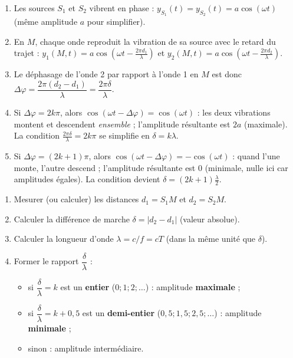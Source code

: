 \documentclass[11pt]{article}
\begin{document}
\begin{experience}
\begin{enumerate}
\item Les sources $S_1$ et $S_2$ vibrent en phase : $y_{S_1}(t) = y_{S_2}(t) = a\cos(\omega t)$ (même amplitude $a$ pour simplifier).
\item En $M$, chaque onde reproduit la vibration de sa source avec le retard du trajet : $y_1(M,t) = a\cos(\omega t - \frac{2\pi d_1}{\lambda})$ et $y_2(M,t) = a\cos(\omega t - \frac{2\pi d_2}{\lambda})$.
\item Le déphasage de l'onde 2 par rapport à l'onde 1 en $M$ est donc $\Delta\varphi = \dfrac{2\pi(d_2 - d_1)}{\lambda} = \dfrac{2\pi\delta}{\lambda}$.
\item Si $\Delta\varphi = 2k\pi$, alors $\cos(\omega t - \Delta\varphi) = \cos(\omega t)$ : les deux vibrations montent et descendent \emph{ensemble} ; l'amplitude résultante est $2a$ (maximale). La condition $\frac{2\pi\delta}{\lambda} = 2k\pi$ se simplifie en $\delta = k\lambda$.
\item Si $\Delta\varphi = (2k+1)\pi$, alors $\cos(\omega t - \Delta\varphi) = -\cos(\omega t)$ : quand l'une monte, l'autre descend ; l'amplitude résultante est $0$ (minimale, nulle ici car amplitudes égales). La condition devient $\delta = (2k+1)\frac{\lambda}{2}$.
\end{enumerate}
\end{experience}

\begin{methode}
\begin{enumerate}
\item Mesurer (ou calculer) les distances $d_1 = S_1M$ et $d_2 = S_2M$.
\item Calculer la différence de marche $\delta = |d_2 - d_1|$ (valeur absolue).
\item Calculer la longueur d'onde $\lambda = c/f = cT$ (dans la même unité que $\delta$).
\item Former le rapport $\dfrac{\delta}{\lambda}$ :
\begin{itemize}
\item si $\dfrac{\delta}{\lambda} = k$ est un \textbf{entier} ($0 ; 1 ; 2 ; \ldots$) : amplitude \textbf{maximale} ;
\item si $\dfrac{\delta}{\lambda} = k + 0{,}5$ est un \textbf{demi-entier} ($0{,}5 ; 1{,}5 ; 2{,}5 ; \ldots$) : amplitude \textbf{minimale} ;
\item sinon : amplitude intermédiaire.
\end{itemize}
\end{enumerate}
\end{methode}
\end{document}

